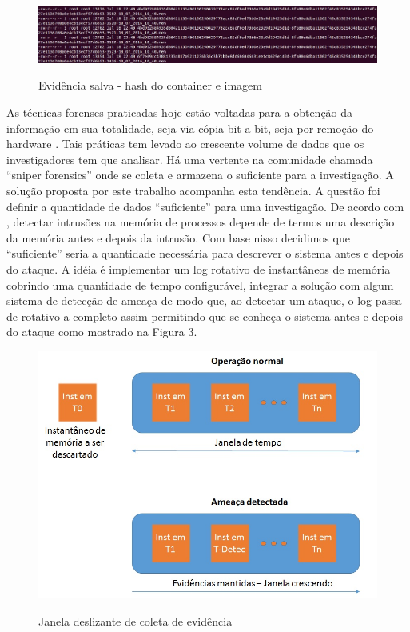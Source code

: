 \documentclass[conference]{IEEEtran}
\begin{document}
\begin{figure}[h!]
\caption{Evidência salva - hash do container e imagem}
\includegraphics[scale=0.2]{snapshot.jpg}
\centering
\label{fig:instantaneo}
\end{figure}

As técnicas forenses praticadas hoje estão voltadas para a obtenção da informação em sua totalidade, seja via cópia bit a bit, seja por remoção do hardware \cite{Simou2014} \cite{Bem2008}. 
%
Tais práticas tem levado ao crescente volume de dados que os investigadores tem que analisar. Há uma vertente na comunidade chamada ``sniper forensics'' onde se coleta e armazena o suficiente para a investigação. 
%
A solução proposta por este trabalho acompanha esta tendência. 
%
A questão foi definir a quantidade de dados ``suficiente'' para uma investigação. 
%
De acordo com \cite{Case2014}, detectar intrusões na memória de processos depende de termos uma descrição da memória antes e depois da intrusão. 
%
Com base nisso decidimos que ``suficiente'' seria a quantidade necessária para descrever o sistema antes e depois do ataque. 
%
A idéia é implementar um log rotativo de instantâneos de memória cobrindo uma quantidade de tempo configurável, integrar a solução com algum sistema de detecção de ameaça de modo que, ao detectar um ataque, o log passa de rotativo a completo assim permitindo que se conheça o sistema antes e depois do ataque como mostrado na Figura 3. \\

\begin{figure}[h!]
\caption{Janela deslizante de coleta de evidência}
\includegraphics[scale=0.4]{janela.jpg}
\centering
\label{fig:janela}
\end{figure}
\end{document}
